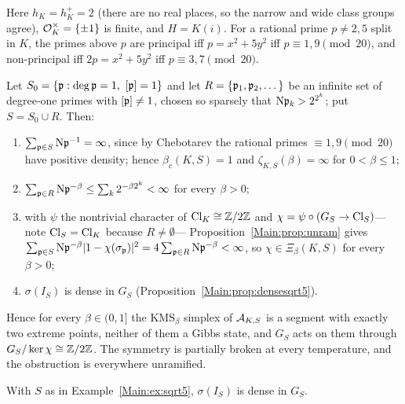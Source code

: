 \begin{example}[$K=\Q(\sqrt{-5})$]\label{Main:ex:sqrt5}
Here $h_K=h^+_K=2$ (there are no real places, so the narrow and wide class
groups agree), $\mathcal{O}_K^\times=\{\pm1\}$ is finite, and $H=K(i)$. For a rational
prime $p\neq2,5$ split in $K$, the primes above $p$ are principal iff
$p=x^2+5y^2$ iff $p\equiv1,9\pmod{20}$, and non-principal iff $2p=x^2+5y^2$
iff $p\equiv3,7\pmod{20}$.

Let $S_0=\{\pp:\deg\pp=1,\ [\pp]=1\}$ and let $R=\{\mathfrak{p}_1,\mathfrak{p}_2,\dots\}$ be an
infinite set of degree-one primes with $[\mathfrak{p}]\neq1$, chosen so sparsely that
$\mathrm{N}\mathfrak{p}_k>2^{2^k}$; put $S=S_0\cup R$. Then:
\begin{enumerate}
\item $\sum_{\mathfrak{p}\in S}\mathrm{N}\mathfrak{p}^{-1}=\infty$, since by Chebotarev the rational
primes $\equiv1,9\pmod{20}$ have positive density; hence $\beta_c(K,S)=1$ and
$\zeta_{K,S}(\beta)=\infty$ for $0<\beta\le1$;
\item $\sum_{\mathfrak{p}\in R}\mathrm{N}\mathfrak{p}^{-\beta}\le\sum_k2^{-\beta2^k}<\infty$ for every
$\beta>0$;
\item with $\psi$ the nontrivial character of $\operatorname{Cl}_K\cong\mathbb{Z}/2\mathbb{Z}$ and
$\chi=\psi\circ(G_S\to\operatorname{Cl}_S)$---note $\operatorname{Cl}_S=\operatorname{Cl}_K$ because $R\neq\emptyset$---
Proposition~\ref{Main:prop:unram} gives
$\sum_{\mathfrak{p}\in S}\mathrm{N}\mathfrak{p}^{-\beta}|1-\chi(\sigma_{\mathfrak{p}})|^2=4\sum_{\mathfrak{p}\in R}\mathrm{N}\mathfrak{p}^{-\beta}<\infty$,
so $\chi\in\Xi_\beta(K,S)$ for every $\beta>0$;
\item $\sigma(I_S)$ is dense in $G_S$ (Proposition~\ref{Main:prop:densesqrt5}).
\end{enumerate}
Hence for every $\beta\in(0,1]$ the $\mathrm{KMS}_\beta$ simplex of $\mathcal{A}_{K,S}$
is a segment with exactly two extreme points, neither of them a Gibbs state,
and $G_S$ acts on them through $G_S/\ker\chi\cong\mathbb{Z}/2\mathbb{Z}$. The symmetry is
partially broken at every temperature, and the obstruction is everywhere
unramified.
\end{example}

\begin{proposition}\label{Main:prop:densesqrt5}
With $S$ as in Example~\ref{Main:ex:sqrt5}, $\sigma(I_S)$ is dense in $G_S$.
\end{proposition}

